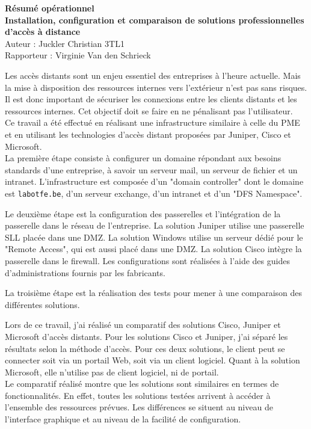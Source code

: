 \documentclass[11pt,a4paper]{article}
\author{Juckler Christian 3TL1}
\title{}
\begin{document}
\begin{center}
{\bfseries Résumé opérationnel}\\
{\bfseries Installation, configuration et comparaison de solutions professionnelles d'accès à distance}\\
Auteur : Juckler Christian 3TL1\\
Rapporteur : Virginie Van den Schrieck
\end{center}
Les accès distants sont un enjeu essentiel des entreprises à l'heure actuelle.
Mais la mise à disposition des ressources internes vers l'extérieur n'est pas sans risques.
Il est donc important de sécuriser les connexions entre les clients distants et les ressources internes.
Cet objectif doit se faire en ne pénalisant pas l'utilisateur.\\

Ce travail a été effectué en réalisant une infrastructure similaire à celle du PME et en utilisant les technologies d'accès distant proposées par Juniper, Cisco et Microsoft.\\

La première étape consiste à configurer un domaine répondant aux besoins standards d'une entreprise, à savoir un serveur mail, un serveur de fichier et un intranet.
L'infrastructure est composée d'un "domain controller" dont le domaine est \texttt{labotfe.be}, d'un serveur exchange, d'un intranet et d'un "DFS Namespace". 

Le deuxième étape est la configuration des passerelles et l'intégration de la passerelle dans le réseau de l'entreprise. 
La solution Juniper utilise une passerelle SLL placée dans une DMZ.
La solution Windows utilise un serveur dédié pour le "Remote Access", qui est aussi placé dans une DMZ.
La solution Cisco intègre la passerelle dans le firewall.
Les configurations sont réalisées à l'aide des guides d'administrations fournis par les fabricants.

La troisième étape est la réalisation des tests pour mener à une comparaison des différentes solutions.

Lors de ce travail, j'ai réalisé un comparatif des solutions Cisco, Juniper et Microsoft d'accès distants.
Pour les solutions Cisco et Juniper, j'ai séparé les résultats selon la méthode d'accès.
Pour ces deux solutions, le client peut se connecter soit via un portail Web, soit via un client logiciel.
Quant à la solution Microsoft, elle n'utilise pas de client logiciel, ni de portail.\\

Le comparatif réalisé montre que les solutions sont similaires en termes de fonctionnalités.
En effet, toutes les solutions testées arrivent à accéder à l'ensemble des ressources prévues. 
Les différences se situent au niveau de l'interface graphique et au niveau de la facilité de configuration.
\end{document}
